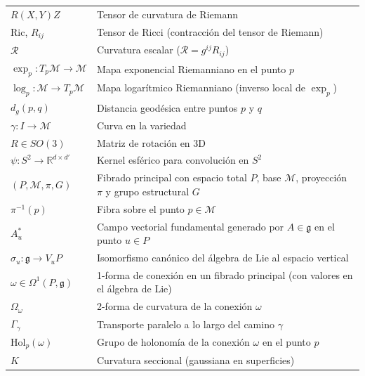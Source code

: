 \begin{longtable}{>{\centering\arraybackslash}p{}p{}}
$R(X,Y)Z$ & Tensor de curvatura de Riemann \\
$\mathrm{Ric}$, $R_{ij}$ & Tensor de Ricci (contracción del tensor de Riemann) \\
$\mathcal{R}$ & Curvatura escalar ($\mathcal{R} = g^{ij}R_{ij}$) \\
$\exp_p: T_p\mathcal{M} \to \mathcal{M}$ & Mapa exponencial Riemanniano en el punto $p$ \\
$\log_p: \mathcal{M} \to T_p\mathcal{M}$ & Mapa logarítmico Riemanniano (inverso local de $\exp_p$) \\
$d_g(p,q)$ & Distancia geodésica entre puntos $p$ y $q$ \\
$\gamma: I \to \mathcal{M}$ & Curva en la variedad \\
$R \in SO(3)$ & Matriz de rotación en 3D \\
$\psi: S^2 \rightarrow \mathbb{R}^{d \times d'}$ & Kernel esférico para convolución en $S^2$ \\
$(P, \mathcal{M}, \pi, G)$ & Fibrado principal con espacio total $P$, base $\mathcal{M}$, proyección $\pi$ y grupo estructural $G$ \\
$\pi^{-1}(p)$ & Fibra sobre el punto $p \in \mathcal{M}$ \\
$A^*_u$ & Campo vectorial fundamental generado por $A \in \mathfrak{g}$ en el punto $u \in P$ \\
$\sigma_u: \mathfrak{g} \to V_u P$ & Isomorfismo canónico del álgebra de Lie al espacio vertical \\
$\omega \in \Omega^1(P, \mathfrak{g})$ & 1-forma de conexión en un fibrado principal (con valores en el álgebra de Lie) \\
$\Omega_\omega$ & 2-forma de curvatura de la conexión $\omega$ \\
$\Gamma_\gamma$ & Transporte paralelo a lo largo del camino $\gamma$ \\
$\text{Hol}_p(\omega)$ & Grupo de holonomía de la conexión $\omega$ en el punto $p$ \\
$K$ & Curvatura seccional (gaussiana en superficies) \\
\end{longtable}

